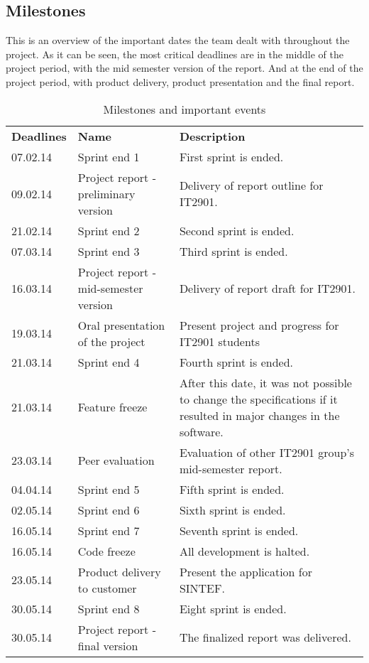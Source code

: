 \subsection{Milestones}
This is an overview of the important dates the team dealt with throughout the project. As it can be seen, the most critical deadlines are in the middle of the project period, with the mid semester version of the report. And at the end of the project period, with product delivery, product presentation and the final report.

\begin{table}[H]
\centering
{}
\begin{tabular}{|l|p{6.7cm}|p{6.5cm}|}
\hline
\textbf{Deadlines} & \textbf{Name} & \textbf{Description}\\
07.02.14 & Sprint end 1 & First sprint is ended. \\
09.02.14& Project report - preliminary version & Delivery of report outline for IT2901.\\
21.02.14& Sprint end 2 & Second sprint is ended. \\
07.03.14& Sprint end 3 & Third sprint is ended.\\
16.03.14& Project report - mid-semester version &  Delivery of report draft for IT2901. \\
19.03.14 & Oral presentation of the project & Present project and progress for IT2901 students\\
21.03.14& Sprint end 4 & Fourth sprint is ended.\\
21.03.14 & Feature freeze & After this date, it was not possible to change the specifications if it resulted in major changes in the software.\\
23.03.14 & Peer evaluation &  Evaluation of other IT2901 group's mid-semester report. \\
04.04.14& Sprint end 5 & Fifth sprint is ended.\\
02.05.14& Sprint end 6 & Sixth sprint is ended.\\
16.05.14& Sprint end 7 & Seventh sprint is ended.\\
16.05.14& Code freeze & All development is halted.\\
23.05.14& Product delivery to customer & Present the application for SINTEF.\\ 
30.05.14& Sprint end 8 & Eight sprint is ended.\\
30.05.14 & Project report - final version & The finalized report was delivered.\\\hline
\end{tabular}
\caption{Milestones and important events}
\label{tab:milestones}
\end{table}

